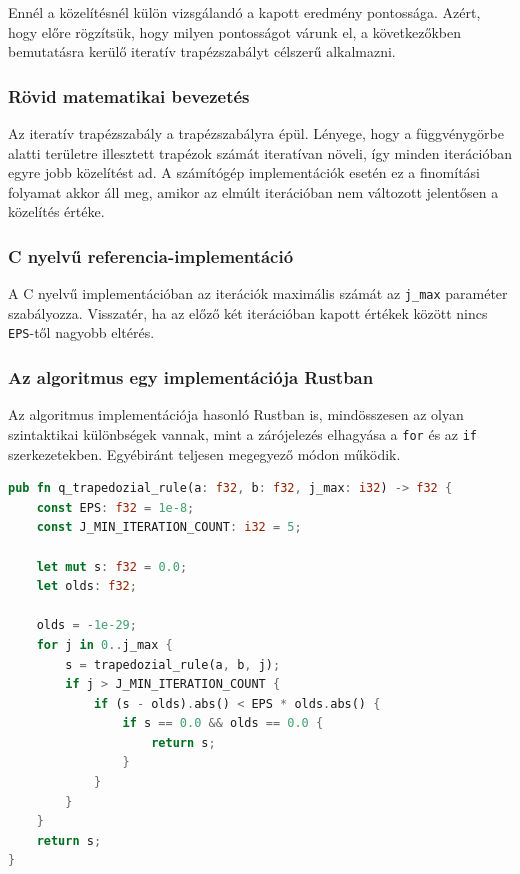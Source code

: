 Ennél a közelítésnél külön vizsgálandó a kapott eredmény pontossága. Azért, hogy előre rögzítsük, hogy milyen pontosságot várunk el, a következőkben bemutatásra kerülő iteratív trapézszabályt célszerű alkalmazni.


\subsubsection{Rövid matematikai bevezetés}

Az iteratív trapézszabály a trapézszabályra épül. Lényege, hogy a függvénygörbe alatti területre illesztett trapézok számát iteratívan növeli, így minden iterációban egyre jobb közelítést ad. A számítógép implementációk esetén ez a finomítási folyamat akkor áll meg, amikor az elmúlt iterációban nem változott jelentősen a közelítés értéke.

\subsubsection{C nyelvű referencia-implementáció}
A C nyelvű implementációban az iterációk maximális számát az \lstinline{j_max} paraméter szabályozza. Visszatér, ha az előző két iterációban kapott értékek között nincs \lstinline{EPS}-től nagyobb eltérés.

\subsubsection{Az algoritmus egy implementációja Rustban}

Az algoritmus implementációja hasonló Rustban is, mindösszesen az olyan szintaktikai különbségek vannak, mint a zárójelezés elhagyása a \lstinline{for} és az \lstinline{if} szerkezetekben. Egyébiránt teljesen megegyező módon működik.
\begin{lstlisting}[language=Rust]
pub fn q_trapedozial_rule(a: f32, b: f32, j_max: i32) -> f32 {
    const EPS: f32 = 1e-8;
    const J_MIN_ITERATION_COUNT: i32 = 5;

    let mut s: f32 = 0.0;
    let olds: f32;

    olds = -1e-29;
    for j in 0..j_max {
        s = trapedozial_rule(a, b, j);
        if j > J_MIN_ITERATION_COUNT {
            if (s - olds).abs() < EPS * olds.abs() {
                if s == 0.0 && olds == 0.0 {
                    return s;
                }
            }
        }
    }
    return s;
}
\end{lstlisting}

